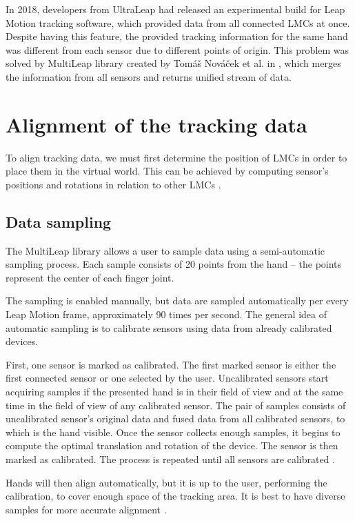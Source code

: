 
In 2018, developers from UltraLeap had released an experimental build for Leap Motion tracking software, which provided data from all connected LMCs at once. Despite having this feature, the provided tracking information for the same hand was different from each sensor due to different points of origin. This problem was solved by MultiLeap library created by Tomáš Nováček et al. in \cite{tomasMultileap}, which merges the information from all sensors and returns unified stream of data. 

\section{Alignment of the tracking data}

To align tracking data, we must first determine the position of LMCs in order to place them in the virtual world. This can be achieved by computing sensor's positions and rotations in relation to other LMCs \cite{tomasMultileap}.

\subsection{Data sampling}

The MultiLeap library allows a user to sample data using a semi-automatic sampling process. Each sample consists of 20 points from the hand – the points represent the center of each finger joint. 

The sampling is enabled manually, but data are sampled automatically per every Leap Motion frame, approximately 90 times per second. The general idea of automatic sampling is to calibrate sensors using data from already calibrated devices.

First, one sensor is marked as calibrated. The first marked sensor is either the first connected sensor or one selected by the user. Uncalibrated sensors start acquiring samples if the presented hand is in their field of view and at the same time in the field of view of any calibrated sensor. The pair of samples consists of uncalibrated sensor's original data and fused data from all calibrated sensors, to which is the hand visible. Once the sensor collects enough samples, it begins to compute the optimal translation and rotation of the device. The sensor is then marked as calibrated. The process is repeated until all sensors are calibrated \cite{tomasMultileap}.


Hands will then align automatically, but it is up to the user, performing the calibration, to cover enough space of the tracking area. It is best to have diverse samples for more accurate alignment \cite{tomasMultileap}.

